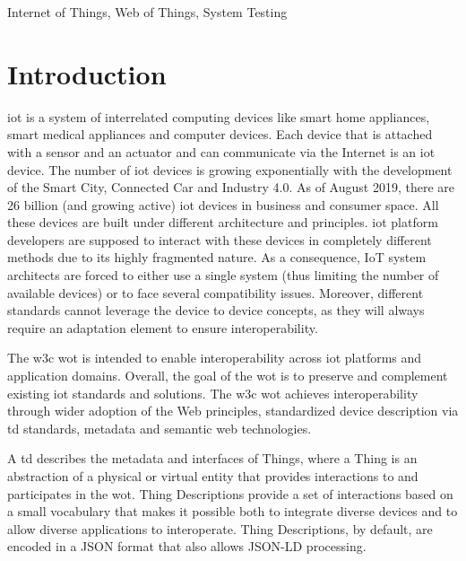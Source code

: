 \documentclass[conference]{IEEEtran}
\theoremstyle{definition}
\begin{document}
\begin{IEEEkeywords}
Internet of Things, Web of Things, System Testing
\end{IEEEkeywords}

\section{Introduction} \label{introduction}

\ac{iot} is a system of interrelated computing devices like smart home appliances, smart medical appliances and computer devices. 
Each device that is attached with a sensor and an actuator and can communicate via the Internet is an \ac{iot} device. 
The number of \ac{iot} devices is growing exponentially with the development of the Smart City, Connected Car and Industry 4.0. 
As of August 2019, there are 26 billion (and growing active) \ac{iot} devices in business and consumer space.
All these devices are built under different architecture and principles. 
\ac{iot} platform developers are supposed to interact with these devices in completely different methods due to its highly fragmented nature.  
As a consequence, IoT system architects are forced to either use a single system (thus limiting the number of available devices) or to face several compatibility issues. 
Moreover, different standards cannot leverage the device to device concepts, as they will always require an adaptation element to ensure interoperability. \cite{fantacci2014short}


The \ac{w3c} \ac{wot} is intended to enable interoperability across \ac{iot} platforms and application domains. 
Overall, the goal of the \ac{wot} is to preserve and complement existing \ac{iot} standards and solutions. 
The \ac{w3c} \ac{wot} achieves interoperability through wider adoption of the Web principles, standardized device description via \ac{td} standards, metadata and semantic web technologies. 

A \ac{td} describes the metadata and interfaces of Things, where a Thing is an abstraction of a physical or virtual entity that provides interactions to and participates in the \ac{wot}. 
Thing Descriptions provide a set of interactions based on a small vocabulary that makes it possible both to integrate diverse devices and to allow diverse applications to interoperate. 
Thing Descriptions, by default, are encoded in a JSON format that also allows JSON-LD processing. 
\end{document}
